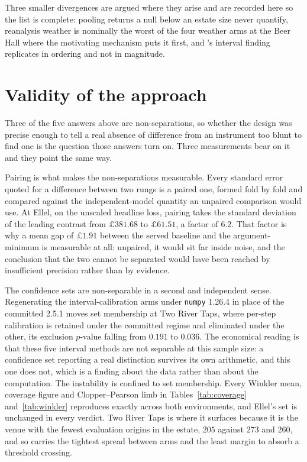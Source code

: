Three smaller divergences are argued where they arise and are recorded here so the list is
complete: pooling returns a null below an estate size \citet{montero-manso_principles_2021} never
quantify, reanalysis weather is nominally the worst of the four weather arms at the Beer Hall
where the motivating mechanism puts it first, and \citet{kaas_probabilistic_2026}'s interval
finding replicates in ordering and not in magnitude.

\section{Validity of the approach}
\label{sec:disc-validity}

Three of the five answers above are non-separations, so whether the design was precise enough to
tell a real absence of difference from an instrument too blunt to find one is the question those
answers turn on. Three measurements bear on it and they point the same way.

Pairing is what makes the non-separations measurable. Every standard error quoted for a
difference between two rungs is a paired one, formed fold by fold and compared against the
independent-model quantity an unpaired comparison would use. At Ellel, on the unscaled headline
loss, pairing takes the standard deviation of the leading contrast from $\pounds 381.68$ to
$\pounds 61.51$, a factor of $6.2$. That factor is why a mean gap of $\pounds 1.91$ between the
served baseline and the argument-minimum is measurable at all: unpaired, it would sit far inside
noise, and the conclusion that the two cannot be separated would have been reached by
insufficient precision rather than by evidence.

The confidence sets are non-separable in a second and independent sense. Regenerating the
interval-calibration arms under \texttt{numpy} 1.26.4 in place of the committed 2.5.1 moves set
membership at Two River Taps, where per-step calibration is retained under the committed regime
and eliminated under the other, its exclusion $p$-value falling from $0.191$ to $0.036$. The
economical reading is that these five interval methods are not separable at this sample size: a
confidence set reporting a real distinction survives its own arithmetic, and this one does not,
which is a finding about the data rather than about the computation. The instability is confined
to set membership. Every Winkler mean, coverage figure and Clopper--Pearson limb in
Tables~\ref{tab:coverage} and~\ref{tab:winkler} reproduces exactly across both environments, and
Ellel's set is unchanged in every verdict. Two River Taps is where it surfaces because it is the
venue with the fewest evaluation origins in the estate, $205$ against $273$ and $260$, and so
carries the tightest spread between arms and the least margin to absorb a threshold crossing.

